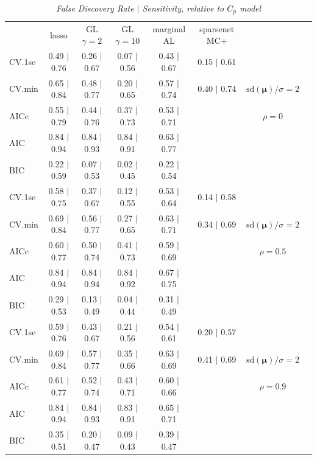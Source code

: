 \documentclass[12pt]{article}
\newcommand{\mr}[1]{\mathrm{#1}}
\newcommand{\bm}[1]{\mathbf{#1}}
\begin{document}
\begin{table}[p]\vspace{-.5cm}
\caption[l]{\it False Discovery Rate $\mid$ Sensitivity, relative to $C_p$ model\hfill}
\vspace{-.5cm}
\small{}
\begin{center}
\begin{tabular}{l*{6}{c}|r}
 & lasso & GL $\gamma=2$ & GL $\gamma=10$ & marginal AL & sparsenet MC+  & \\
 \cline{1-7}
CV.1se & 0.49 $\mid$ 0.76 & 0.26 $\mid$ 0.67 & 0.07 $\mid$ 0.56 & 0.43 $\mid$ 0.67 & 0.15 $\mid$ 0.61 &\\
CV.min & 0.65 $\mid$ 0.84 & 0.48 $\mid$ 0.77 & 0.20 $\mid$ 0.65 & 0.57 $\mid$ 0.74 & 0.40 $\mid$ 0.74 &  $\mr{sd}(\bm{\mu})/\sigma=2$ \\
AICc & 0.55 $\mid$ 0.79 & 0.44 $\mid$ 0.76 & 0.37 $\mid$ 0.73 & 0.53 $\mid$ 0.71 & & $\rho=0$ \\
AIC & 0.84 $\mid$ 0.94 & 0.84 $\mid$ 0.93 & 0.84 $\mid$ 0.91 & 0.63 $\mid$ 0.77 & &  \\
BIC & 0.22 $\mid$ 0.59 & 0.07 $\mid$ 0.53 & 0.02 $\mid$ 0.45 & 0.22 $\mid$ 0.54 & & \\
 \hline 
CV.1se & 0.58 $\mid$ 0.75 & 0.37 $\mid$ 0.67 & 0.12 $\mid$ 0.55 & 0.53 $\mid$ 0.64 & 0.14 $\mid$ 0.58 &\\
CV.min & 0.69 $\mid$ 0.84 & 0.56 $\mid$ 0.77 & 0.27 $\mid$ 0.65 & 0.63 $\mid$ 0.71 & 0.34 $\mid$ 0.69 &  $\mr{sd}(\bm{\mu})/\sigma=2$ \\
AICc & 0.60 $\mid$ 0.77 & 0.50 $\mid$ 0.74 & 0.41 $\mid$ 0.73 & 0.59 $\mid$ 0.69 & & $\rho=0.5$ \\
AIC & 0.84 $\mid$ 0.94 & 0.84 $\mid$ 0.94 & 0.84 $\mid$ 0.92 & 0.67 $\mid$ 0.75 & &  \\
BIC & 0.29 $\mid$ 0.53 & 0.13 $\mid$ 0.49 & 0.04 $\mid$ 0.44 & 0.31 $\mid$ 0.49 & & \\
 \hline 
CV.1se & 0.59 $\mid$ 0.76 & 0.43 $\mid$ 0.67 & 0.21 $\mid$ 0.56 & 0.54 $\mid$ 0.61 & 0.20 $\mid$ 0.57 &\\
CV.min & 0.69 $\mid$ 0.84 & 0.57 $\mid$ 0.77 & 0.35 $\mid$ 0.66 & 0.63 $\mid$ 0.69 & 0.41 $\mid$ 0.69 &  $\mr{sd}(\bm{\mu})/\sigma=2$ \\
AICc & 0.61 $\mid$ 0.77 & 0.52 $\mid$ 0.74 & 0.43 $\mid$ 0.71 & 0.60 $\mid$ 0.66 & & $\rho=0.9$ \\
AIC & 0.84 $\mid$ 0.94 & 0.84 $\mid$ 0.93 & 0.83 $\mid$ 0.91 & 0.65 $\mid$ 0.71 & &  \\
BIC & 0.35 $\mid$ 0.51 & 0.20 $\mid$ 0.47 & 0.09 $\mid$ 0.43 & 0.39 $\mid$ 0.47 & & \\

\end{tabular}
\end{center}
\end{table}
\end{document}
